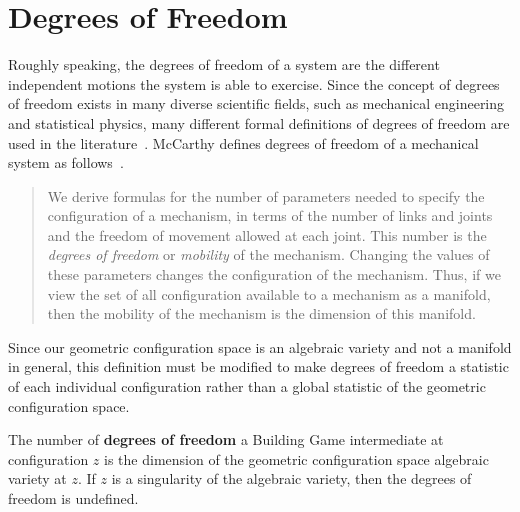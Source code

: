 \section{Degrees of Freedom}
Roughly speaking, the degrees of freedom of a system are the different independent motions the system is able to exercise. Since the concept of degrees of freedom exists in many diverse scientific fields, such as mechanical engineering and statistical physics, many different formal definitions of degrees of freedom are used in the literature~\cite{Pennestri2005}. McCarthy defines degrees of freedom of a mechanical system as follows~\cite{McCarthy1990}. 
\begin{quote}
We derive formulas for the number of parameters needed to specify the configuration of a mechanism, in terms of the number of links and joints and the freedom of movement allowed at each joint. This number is the \textit{degrees of freedom} or \textit{mobility} of the mechanism. Changing the values of these parameters changes the configuration of the mechanism. Thus, if we view the set of all configuration available to a mechanism as a manifold, then the mobility of the mechanism is the dimension of this manifold. 
\end{quote}

Since our geometric configuration space is an algebraic variety and not a manifold in general, this definition must be modified to make degrees of freedom a statistic of each individual configuration rather than a global statistic of the geometric configuration space. 

\begin{mydef}
The number of \textbf{degrees of freedom} a Building Game intermediate at configuration $z$ is the dimension of the geometric configuration space algebraic variety at $z$. If $z$ is a singularity of the algebraic variety, then the degrees of freedom is undefined.
\end{mydef}

